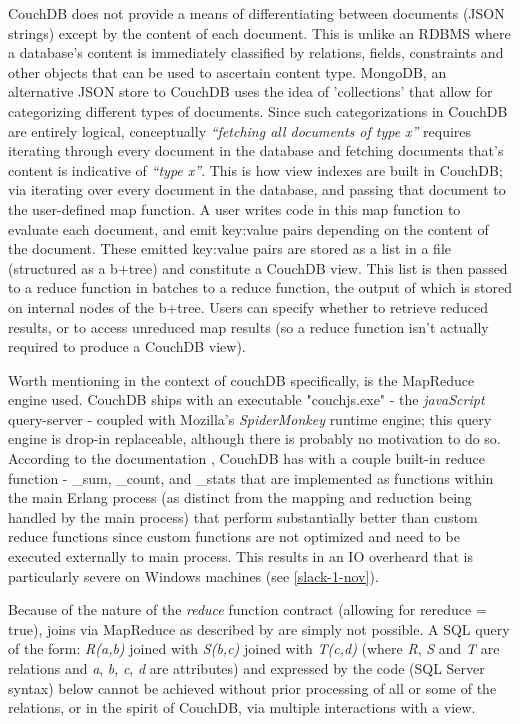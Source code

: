 CouchDB does not provide a means of differentiating between documents (JSON strings) except by the content of each document. This is unlike an RDBMS where a database's content is immediately classified by relations, fields, constraints and other objects that can be used to ascertain content type. MongoDB, an alternative JSON store to CouchDB uses the idea of 'collections' that allow for categorizing different types of documents. Since such categorizations in CouchDB are entirely logical, conceptually \textit{``fetching all documents of type x''} requires iterating through every document in the database and fetching documents that's content is indicative of \textit{``type x''}. This is how view indexes are built in CouchDB; via iterating over every document in the database, and passing that document to the user-defined map function. A user writes code in this map function to evaluate each document, and emit key:value pairs depending on the content of the document. These emitted key:value pairs are stored as a list in a file (structured as a b+tree) and constitute a CouchDB view. This list is then passed to a reduce function in batches to a reduce function, the output of which is stored on internal nodes of the b+tree. Users can specify whether to retrieve reduced results, or to access unreduced map results (so a reduce function isn't actually required to produce a CouchDB view).

Worth mentioning in the context of couchDB specifically, is the MapReduce engine used. CouchDB ships with an executable "couchjs.exe" - the \textit{javaScript} query-server - coupled with Mozilla's \textit{SpiderMonkey} runtime engine; this query engine is drop-in replaceable, although there is probably no motivation to do so. According to the documentation \cite{builtincouchreduce}, CouchDB has with a couple built-in reduce function - \_sum, \_count, and \_stats that are implemented as functions within the main Erlang process (as distinct from the mapping and reduction being handled by the main process) that perform substantially better than custom reduce functions since custom functions are not optimized and need to be executed externally to main process. This results in an I\/O overheard that is particularly severe on Windows machines (see \ref{slack-1-nov}).

Because of the nature of the \textit{reduce} function contract (allowing for rereduce = true), joins via MapReduce as described by \cite{chandar2010} are simply not possible. A SQL query of the form: \textit{R(a,b)} joined with \textit{S(b,c)} joined with \textit{T(c,d)} (where \textit{R}, \textit{S} and \textit{T} are relations and \textit{a}, \textit{b}, \textit{c}, \textit{d} are attributes) and expressed by the code (SQL Server syntax) below cannot be achieved without prior processing of all or some of the relations, or in the spirit of CouchDB, via multiple interactions with a view.

